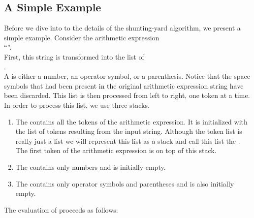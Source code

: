 \subsection{A Simple Example}
Before we dive into to the details of the shunting-yard algorithm, we present a
simple example.  Consider the arithmetic expression 
\\[0.2cm]
\hspace*{1.3cm} 
``''. 
\\[0.2cm]
First, this string is transformed into the list of 
\\[0.2cm]
\hspace*{1.3cm}
.
\\[0.2cm]
A  is either a number, an operator symbol, or a parenthesis.
Notice that the space symbols that had been present in the original arithmetic expression string
have been discarded.  This list is then processed from left to right, one token
 at a time.  In order to process this list, we use three stacks.
\begin{enumerate}
\item The   contains all the tokens of the arithmetic expression.  It is
      initialized with the list of tokens resulting from the input string.
      Although the token list is really just a list we will represent this list as a stack and call
      this list the .
      The first token of the arithmetic expression is on top of this stack.
\item The   contains only numbers and is initially empty.
\item The  contains only operator symbols and parentheses and is also initially
      empty.
\end{enumerate}
The evaluation of  proceeds as follows:
